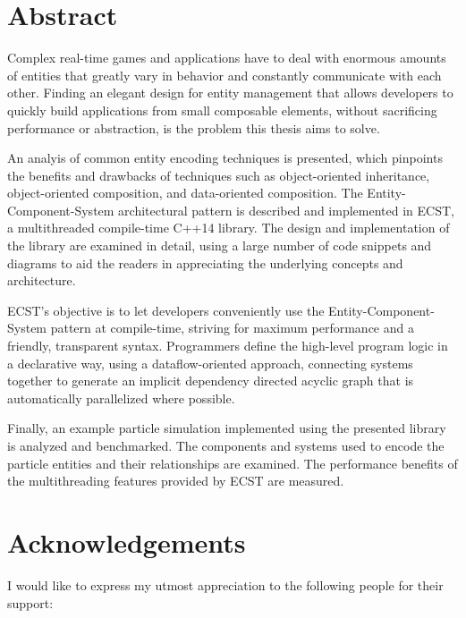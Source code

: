 \documentclass[twoside, 12pt, a4paper, openany]{book}
\begin{document}
\chapter*{Abstract}\label{abstract}

Complex real-time games and applications have to deal with enormous
amounts of entities that greatly vary in behavior and constantly
communicate with each other. Finding an elegant design for entity
management that allows developers to quickly build applications from
small composable elements, without sacrificing performance or
abstraction, is the problem this thesis aims to solve.

An analyis of common entity encoding techniques is presented, which
pinpoints the benefits and drawbacks of techniques such as
object-oriented inheritance, object-oriented composition, and
data-oriented composition. The Entity-Component-System architectural
pattern is described and implemented in ECST, a multithreaded
compile-time C++14 library. The design and implementation of the library
are examined in detail, using a large number of code snippets and
diagrams to aid the readers in appreciating the underlying concepts and
architecture.

ECST's objective is to let developers conveniently use the
Entity-Component-System pattern at compile-time, striving for maximum
performance and a friendly, transparent syntax. Programmers define the
high-level program logic in a declarative way, using a dataflow-oriented
approach, connecting systems together to generate an implicit dependency
directed acyclic graph that is automatically parallelized where
possible.

Finally, an example particle simulation implemented using the presented
library is analyzed and benchmarked. The components and systems used to
encode the particle entities and their relationships are examined. The
performance benefits of the multithreading features provided by ECST are
measured.

\chapter*{Acknowledgements}\label{acknowledgements}

I would like to express my utmost appreciation to the following people
for their support:
\end{document}
